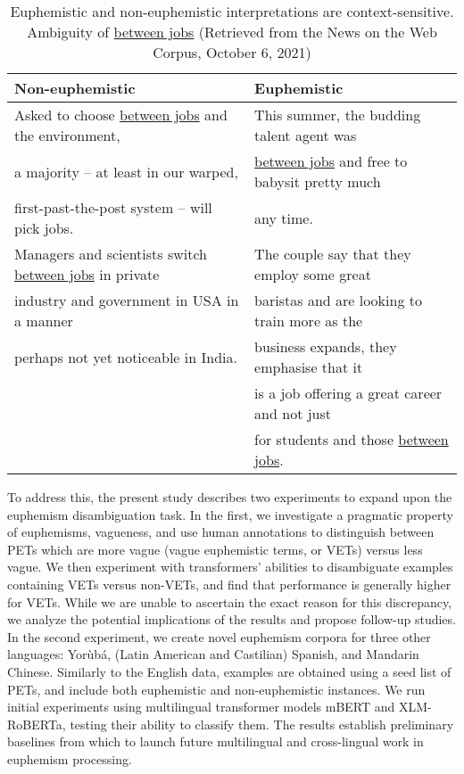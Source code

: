 \documentclass[11pt]{article}
\begin{document}
\begin{table*}[htp]
\begin{small}
    \centering
    \begin{tabular}{l|l}
    Non-euphemistic & Euphemistic\\\hline
Asked to choose \underline{between jobs} and the environment,&This summer, the budding talent agent was\\
a majority -- at least in our warped, &  \underline{between jobs} and free to babysit pretty much \\ 
first-past-the-post system -- will pick jobs. &any time. \\
         \hline
Managers and scientists switch \underline{between jobs} in private & The couple say that they employ some great \\
industry and government in USA in a manner &  baristas and are looking to train more as the \\
 perhaps not yet noticeable in India.& business expands, they emphasise that it \\
& is a job offering a great career and not just\\
&  for students and those \underline{between jobs}. \\
\hline
    \end{tabular}
    \caption{Euphemistic and non-euphemistic interpretations are context-sensitive. \\Ambiguity of \underline{between jobs} (Retrieved from the News on the Web Corpus, October 6, 2021)}
    \label{tab:ambiguity}
    \end{small}
\end{table*}


To address this, the present study describes two experiments to expand upon the euphemism disambiguation task. In the first, we investigate a pragmatic property of euphemisms, vagueness, and use human annotations to distinguish between PETs which are more vague (vague euphemistic terms, or VETs) versus less vague. We then experiment with transformers' abilities to disambiguate examples containing VETs versus non-VETs, and find that performance is generally higher for VETs. While we are unable to ascertain the exact reason for this discrepancy, we analyze the potential implications of the results and propose follow-up studies. In the second experiment, we create novel euphemism corpora for three other languages: Yor\`{u}b\'{a}, (Latin American and Castilian) Spanish, and Mandarin Chinese. Similarly to the English data, examples are obtained using a seed list of PETs, and include both euphemistic and non-euphemistic instances. We run initial experiments using multilingual transformer models mBERT and XLM-RoBERTa, testing their ability to classify them. The results establish preliminary baselines from which to launch future multilingual and cross-lingual work in euphemism processing.
\end{document}
